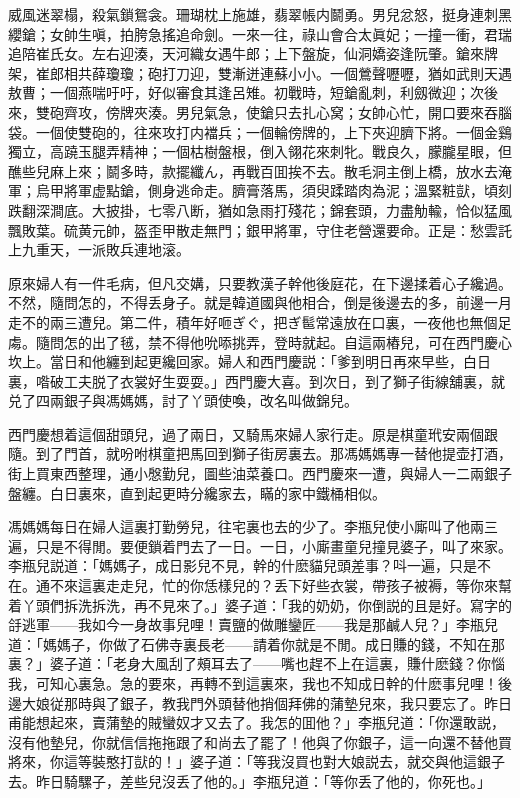 \begin{myquote}
威風迷翠榻，殺氣鎖鴛衾。珊瑚枕上施雄，翡翠帳内鬬勇。男兒忿怒，挺身連刺黑纓鎗；女帥生嗔，拍胯急搖追命劍。一來一往，祿山會合太眞妃；一撞一衝，君瑞追陪崔氏女。左右迎湊，天河織女遇牛郎；上下盤旋，仙洞嬌姿逢阮肇。鎗來牌架，崔郎相共薛瓊瓊；砲打刀迎，雙漸迸連蘇小小。一個鶯聲嚦嚦，猶如武則天遇敖曹；一個燕喘吁吁，好似審食其逢呂雉。初戰時，短鎗亂刺，利劔微迎；次後來，雙砲齊攻，傍牌夾湊。男兒氣急，使鎗只去扎心窝；女帥心忙，開口要來吞腦袋。一個使雙砲的，往來攻打内襠兵；一個輪傍牌的，上下夾迎臍下將。一個金鷄獨立，高蹺玉腿弄精神；一個枯樹盤根，倒入翎花來刺牝。戰良久，朦朧星眼，但醮些兒麻上來；鬬多時，款擺纖ん，再戰百囬挨不去。散毛洞主倒上橋，放水去淹軍；烏甲將軍虚點鎗，側身逃命走。臍膏落馬，須臾蹂踏肉為泥；溫緊粧獃，頃刻跌翻深澗底。大披掛，七零八断，猶如急雨打殘花；錦套頭，力盡觔輸，恰似猛風飄敗葉。硫黄元帥，盔歪甲散走無門；銀甲將軍，守住老營還要命。正是：愁雲託上九重天，一派敗兵連地滚。
\end{myquote}

原來婦人有一件毛病，但凡交媾，只要教漢子幹他後庭花，在下邊揉着心子纔過。不然，隨問怎的，不得丢身子。就是韓道國與他相合，倒是後邊去的多，前邊一月走不的兩三遭兒。第二件，積年好咂ぎぐ，把ぎ䯲常遠放在口裏，一夜他也無個足䖏。隨問怎的出了毧，禁不得他吮㖭挑弄，登時就起。自這兩樁兒，可在西門慶心坎上。當日和他纏到起更纔回家。婦人和西門慶説：「爹到明日再來早些，白日裏，喒破工夫脱了衣裳好生耍耍。」西門慶大喜。到次日，到了獅子街線舖裏，就兑了四兩銀子與馮媽媽，討了丫頭使喚，改名叫做錦兒。

西門慶想着這個甜頭兒，過了兩日，又騎馬來婦人家行走。原是棋童玳安兩個跟隨。到了門首，就吩咐棋童把馬回到獅子街房裏去。那馮媽媽專一替他提壶打酒，街上買東西整理，通小慇勤兒，圖些油菜養口。西門慶來一遭，與婦人一二兩銀子盤纏。白日裏來，直到起更時分纔家去，瞞的家中鐵桶相似。

馮媽媽每日在婦人這裏打勤勞兒，往宅裏也去的少了。李瓶兒使小廝叫了他兩三遍，只是不得閒。要便鎖着門去了一日。一日，小廝畫童兒撞見婆子，叫了來家。李瓶兒説道：「媽媽子，成日影兒不見，幹的什麽貓兒頭差事？呌一遍，只是不在。通不來這裏走走兒，忙的你恁樣兒的？丢下好些衣裳，帶孩子被褥，等你來幫着丫頭們拆洗拆洗，再不見來了。」婆子道：「我的奶奶，你倒説的且是好。寫字的㧱逃軍——我如今一身故事兒哩！賣鹽的做雕鑾匠——我是那鹹人兒？」李瓶兒道：「媽媽子，你做了石佛寺裏長老——請着你就是不閒。成日賺的錢，不知在那裏？」婆子道：「老身大風刮了頰耳去了——嘴也趕不上在這裏，賺什麽錢？你惱我，可知心裏急。急的要來，再轉不到這裏來，我也不知成日幹的什麽事兒哩！後邊大娘従那時與了銀子，教我門外頭替他捎個拜佛的蒲墊兒來，我只要忘了。昨日甫能想起來，賣蒲墊的賊蠻奴才又去了。我怎的囬他？」李瓶兒道：「你還敢説，沒有他墊兒，你就信信拖拖跟了和尚去了罷了！他與了你銀子，這一向還不替他買將來，你這等裝憨打獃的！」婆子道：「等我沒買也對大娘説去，就交與他這銀子去。昨日騎騾子，差些兒沒丢了他的。」李瓶兒道：「等你丢了他的，你死也。」

